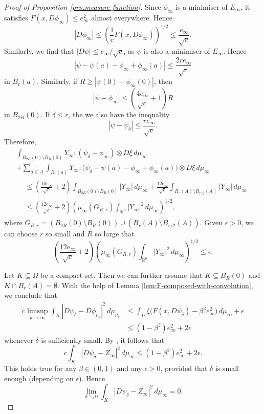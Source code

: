 \documentclass[a4paper]{article}
\newcommand{\R}{\mathbb{R}}
\theoremstyle{definition}
\theoremstyle{remark}
\begin{document}
\begin{proof}[Proof of Proposition \ref{prp:measure-function}]
Since $\phi_\infty$ is a minimiser of $E_\infty$, it satisfies
$F(x, D\phi_\infty) \le e_\infty^2$ almost everywhere. Hence
\[
|D\phi_\infty| \le \left(\frac{1}{c} F(x, D\phi_\infty)\right)^{1/2} \le \frac{e_\infty}{\sqrt{c}}.
\]
Similarly, we find that $|D\psi| \le e_\infty/\sqrt{c}$, as $\psi$ is also
a minimiser of $E_\infty$. Hence
\[
|\psi - \psi(a) - \phi_\infty + \phi_\infty(a)| \le \frac{2r e_\infty}{\sqrt{c}}
\]
in $B_r(a)$. Similarly, if $R \ge |\psi(0) - \phi_\infty(0)|$, then
\[
|\psi - \phi_\infty| \le \left(\frac{4e_\infty}{\sqrt{c}} + 1\right)R
\]
in $B_{2R}(0)$.
If $\delta \le r$, the we also have the inequality
\[
|\psi - \psi_\delta| \le \frac{re_\infty}{\sqrt{c}}.
\]
Therefore,
\begin{multline*}
\int_{B_{2R}(0) \setminus B_R(0)} Y_\infty : (\psi_\delta - \phi_\infty) \otimes D\xi \, d\mu_\infty \\
+ \sum_{a \in A} \int_{B_r(a)} Y_\infty : \bigl(\psi_\delta - \psi(a) - \phi_\infty + \phi_\infty(a)\bigr) \otimes D\xi \, d\mu_\infty \\
\begin{aligned}
& \le \left(\frac{10e_\infty}{\sqrt{c}} + 2\right) \int_{B_{2R}(0) \setminus B_R(0)} |Y_\infty| \, d\mu_\infty + \frac{12 e_\infty}{\sqrt{c}} \int_{B_r(A) \setminus B_{r/2}(A)} |Y_\infty| \, d\mu_\infty \\
& \le \left(\frac{12 e_\infty}{\sqrt{c}} + 2\right) \left(\mu_\infty(G_{R, r}) \int_{\R^n} |Y_\infty|^2 \, d\mu_\infty\right)^{1/2},
\end{aligned}
\end{multline*}
where $G_{R, r} = (B_{2R}(0) \setminus B_R(0)) \cup (B_r(A) \setminus B_{r/2}(A))$.
Given $\epsilon > 0$, we can choose $r$ so small and $R$ so large that
\[
\left(\frac{12 e_\infty}{\sqrt{c}} + 2\right) \left(\mu_\infty(G_{R, r}) \int_{\R^n} |Y_\infty|^2 \, d\mu_\infty\right)^{1/2} \le \epsilon.
\]

Let $K \subseteq \Omega$ be a compact set. Then we can further assume that $K \subseteq B_R(0)$ and 
$K \cap B_r(A) = \emptyset$. With the help of Lemma \ref{lem:F-composed-with-convolution}, we conclude that
\begin{equation} \label{eq:key-estimate}
\begin{split}
c \limsup_{k \to \infty} \int_K |D\psi_\delta - D\phi_{p_k}|^2 \, d\mu_{p_k} & \le \int_\Omega \xi \bigl(F(x, D\psi_\delta) - \beta^2 e_\infty^2\bigr) \, d\mu_\infty + \epsilon \\
& \le (1 - \beta^2) e_\infty^2 + 2\epsilon
\end{split}
\end{equation}
whenever $\delta$ is sufficiently small.
By \cite[Theorem 4.4.2]{Hutchinson:86}, it follows that
\[
c \int_K |D\psi_\delta - Z_\infty|^2 \, d\mu_\infty \le (1 - \beta^2) e_\infty^2 + 2\epsilon.
\]
This holds true for any $\beta \in (0, 1)$ and any $\epsilon > 0$, provided
that $\delta$ is small enough (depending on $\epsilon$). Hence
\begin{equation} \label{eq:local-L2-convergence}
\lim_{\delta \searrow 0} \int_K |D\psi_\delta - Z_\infty|^2 \, d\mu_\infty = 0.
\end{equation}


\end{proof}
\end{document}
